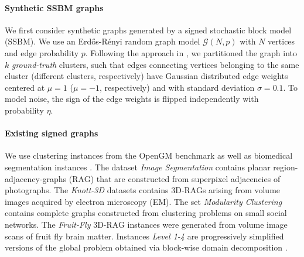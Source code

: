 \paragraph{Synthetic SSBM graphs} We first consider synthetic graphs generated by a signed stochastic block model (SSBM). We use an Erd\H os-R\'enyi random graph model $\mathcal{G}(N,p)$ with $N$ vertices and edge probability $p$. Following the approach in \cite{Cucuringu2019SPONGEAG}, we partitioned the graph into $k$ \emph{ground-truth} clusters, such that edges connecting vertices belonging to the same cluster (different clusters, respectively) have Gaussian distributed edge weights centered at $\mu=1$ ($\mu=-1$, respectively) and with standard deviation $\sigma=0.1$. To model noise, the sign of the edge weights is flipped independently with probability $\eta$.


\paragraph{Existing signed graphs}   We use clustering instances from the OpenGM benchmark \cite{kappes2013comparative} as well as biomedical segmentation instances \cite{pape2017solving}. The dataset \emph{Image Segmentation} contains planar region-adjacency-graphs (RAG) that are constructed from superpixel adjacencies of photographs. The \emph{Knott-3D} datasets contains 3D-RAGs arising from volume images acquired by electron microscopy (EM). The set \emph{Modularity Clustering} contains complete graphs constructed from clustering problems on small social networks. The \emph{Fruit-Fly} 3D-RAG instances were generated from volume image scans of fruit fly brain matter. Instances \emph{Level 1-4} are progressively simplified versions of the global problem obtained via block-wise domain decomposition \cite{pape2017solving}.

